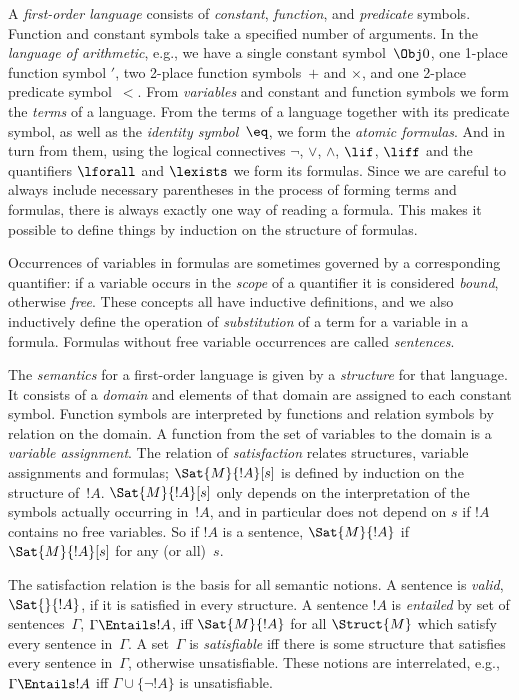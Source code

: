 A \emph{first-order language} consists of \emph{constant},
\emph{function}, and \emph{predicate} symbols. Function and constant
symbols take a specified number of arguments. In the \emph{language of
arithmetic}, e.g., we have a single constant symbol~$\Obj 0$, one
1-place function symbol $\prime$, two 2-place function symbols~$+$ and
$\times$, and one 2-place predicate symbol~$<$. From \emph{variables}
and constant and function symbols we form the \emph{terms} of a
language. From the terms of a language together with its predicate
symbol, as well as the \emph{identity symbol}~$\eq$, we form the
\emph{atomic formulas}. And in turn from them, using the logical
connectives $\lnot$, $\lor$, $\land$, $\lif$, $\liff$ and the
quantifiers $\lforall$ and $\lexists$ we form its formulas. Since we
are careful to always include necessary parentheses in the process of
forming terms and formulas, there is always exactly one way of reading
a formula. This makes it possible to define things by induction on the
structure of formulas.

Occurrences of variables in formulas are sometimes governed by a
corresponding quantifier: if a variable occurs in the \emph{scope} of
a quantifier it is considered \emph{bound}, otherwise
\emph{free}. These concepts all have inductive definitions, and we
also inductively define the operation of \emph{substitution} of a term
for a variable in a formula. Formulas without free variable
occurrences are called \emph{sentences}.

The \emph{semantics} for a first-order language is given by a
\emph{structure} for that language. It consists of a \emph{domain} and
elements of that domain are assigned to each constant symbol. Function
symbols are interpreted by functions and relation symbols by relation
on the domain. A function from the set of variables to the domain is
a \emph{variable assignment}. The relation of \emph{satisfaction}
relates structures, variable assignments and formulas;
$\Sat{M}{!A}[s]$ is defined by induction on the structure of~$!A$.
$\Sat{M}{!A}[s]$ only depends on the interpretation of the symbols
actually occurring in~$!A$, and in particular does not depend on $s$
if $!A$ contains no free variables. So if $!A$ is a sentence,
$\Sat{M}{!A}$ if $\Sat{M}{!A}[s]$ for any (or all)~$s$.

The satisfaction relation is the basis for all semantic notions. A
sentence is \emph{valid}, $\Sat{{}}{!A}$, if it is satisfied in every
structure. A sentence $!A$ is \emph{entailed} by set of
sentences~$\Gamma$, $\Gamma \Entails !A$, iff $\Sat{M}{!A}$ for all
$\Struct{M}$ which satisfy every sentence in~$\Gamma$. A set~$\Gamma$
is \emph{satisfiable} iff there is some structure that satisfies every
sentence in~$\Gamma$, otherwise unsatisfiable. These notions are
interrelated, e.g., $\Gamma \Entails !A$ iff $\Gamma \cup \{\lnot
!A\}$ is unsatisfiable.
